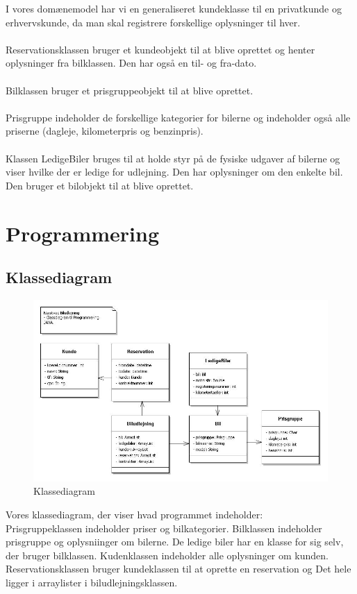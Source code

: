 \documentclass[11pt]{article}
\begin{document}
I vores domænemodel har vi en generaliseret kundeklasse til en privatkunde og erhvervskunde, da man skal registrere forskellige oplysninger til hver.\\\\
Reservationsklassen bruger et kundeobjekt til at blive oprettet og henter oplysninger fra bilklassen. Den har også en til- og fra-dato.\\\\
Bilklassen bruger et prisgruppeobjekt til at blive oprettet.\\\\
Prisgruppe indeholder de forskellige kategorier for bilerne og indeholder også alle priserne (dagleje, kilometerpris og benzinpris).\\\\
Klassen LedigeBiler bruges til at holde styr på de fysiske udgaver af bilerne og viser hvilke der er ledige for udlejning. Den har oplysninger om den enkelte bil. Den bruger et bilobjekt til at blive oprettet.

\section*{Programmering}
\subsection*{Klassediagram}
\begin{figure}
  \centering
  \includegraphics[width=15cm]{Classdiagram_prog.jpg}
  \caption{Klassediagram}
  \label{fig:Klassediagram}
\end{figure}

Vores klassediagram, der viser hvad programmet indeholder:\\
Prisgruppeklassen indeholder priser og bilkategorier. Bilklassen indeholder prisgruppe og oplysniinger om bilerne. De ledige biler har en klasse for sig selv, der bruger bilklassen. Kudenklassen indeholder alle oplysninger om kunden. Reservationsklassen bruger kundeklassen til at oprette en reservation og Det hele ligger i arraylister i biludlejningsklassen.
\end{document}
